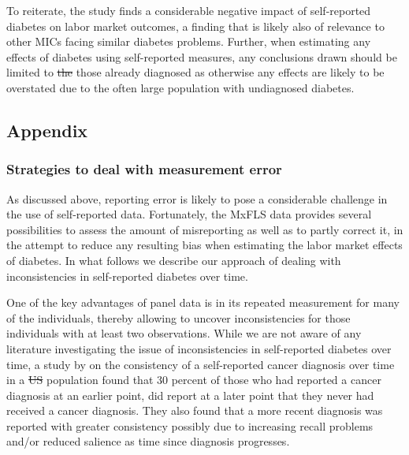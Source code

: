 \documentclass[12pt,english,british]{article}
\providecommand{\DIFaddtex}[1]{{\protect\color{blue}\uwave{#1}}} %
\providecommand{\DIFdeltex}[1]{{\protect\color{red}\sout{#1}}}                      %
\providecommand{\DIFaddbegin}{} %
\providecommand{\DIFaddend}{} %
\providecommand{\DIFdelbegin}{} %
\providecommand{\DIFdelend}{} %
\providecommand{\DIFadd}[1]{\texorpdfstring{\DIFaddtex{#1}}{#1}} %
\providecommand{\DIFdel}[1]{\texorpdfstring{\DIFdeltex{#1}}{}} %
\begin{document}
To reiterate, the study finds a considerable negative impact of self-reported diabetes on labor market outcomes, a finding that is likely also of relevance to other \ac{MICs} facing similar diabetes problems. Further, when estimating any effects of diabetes using self-reported measures, any conclusions drawn should be limited to \DIFdelbegin \DIFdel{the }\DIFdelend those already diagnosed as otherwise any effects are likely to be overstated due to the often large population with undiagnosed diabetes.


\begin{appendix}
\clearpage


\part*{Appendix}

\section{Strategies to deal with measurement error}

As discussed above, reporting error is likely to pose a considerable
challenge in the use of self-reported data. Fortunately, the \ac{MxFLS}
data provides several possibilities to assess the amount of misreporting
as well as to partly correct it, in the attempt to reduce any resulting
bias when estimating the labor market effects of diabetes. In what
follows we describe our approach of dealing with inconsistencies in
self-reported diabetes over time.

One of the key advantages of panel data is in its repeated measurement
for many of the individuals, thereby allowing to uncover inconsistencies
for those individuals with at least two observations. While we are
not aware of any literature investigating the issue of inconsistencies
in self-reported diabetes over time, a study by \citet{Zajacova2010}
on the consistency of a self-reported cancer diagnosis over time in
a \DIFdelbegin \DIFdel{US }\DIFdelend \DIFaddbegin \DIFadd{USA }\DIFaddend population found that 30 percent of those who had reported a
cancer diagnosis at an earlier point, did report at a later point
that they never had received a cancer diagnosis. They also found that
a more recent diagnosis was reported with greater consistency possibly
due to increasing recall problems and/or reduced salience as time
since diagnosis progresses.


\end{appendix}
\end{document}
